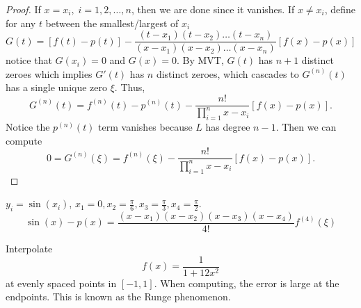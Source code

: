 \documentclass[11pt]{article}
\begin{document}
\begin{proof}
    If $x = x_i, \; i = 1,2,\dots, n$, then we are done since it vanishes. If $x \ne x_i$, define for any $t$ between the smallest/largest of $x_i$
    \[
        G(t) = [f(t)-p(t)]-\frac{(t-x_1)(t-x_2)\dots(t-x_n)}{(x-x_1)(x-x_2)\dots(x-x_n)}[f(x)-p(x)]
    \]
    notice that $G(x_i) = 0$ and $G(x) = 0$. By MVT, $G(t)$ has $n+1$ distinct zeroes which implies $G'(t)$ has $n$ distinct zeroes, which cascades to $G^{(n)}(t)$ has a single unique zero $\xi$.
    Thus,
    \[
        G^{(n)}(t)=f^{(n)}(t)-p^{(n)}(t) - \frac{n!}{\prod_{i=1}^{n}x-x_i }[f(x)-p(x)].
    \]
    Notice the $p^{(n)}(t)$ term vanishes because $L$ has degree $n-1$. Then we can compute
    \[
        0 = G^{(n)}(\xi)=f^{(n)}(\xi) -\frac{n!}{\prod_{i=1}^{n}x-x_i }[f(x)-p(x)]. 
    \]
    
\end{proof}

\begin{example}
    $y_i = \sin(x_i)$, $x_1 = 0, x_2 = \frac{\pi}{6}, x_3 = \frac{\pi }{3}, x_4 = \frac{\pi }{2}$.
    \[
        \sin(x) - p(x) = \frac{(x-x_1)(x-x_2)(x-x_3)(x-x_4)}{4!}f^{(4)}(\xi)
    \]
\end{example}

\begin{example}
    Interpolate \[
        f(x) = \frac{1}{1+12x^2}
    \]
    at evenly spaced points in $[-1, 1]$. When computing, the error is large at the endpoints. This is known as the Runge phenomenon.
\end{example}
\end{document}
